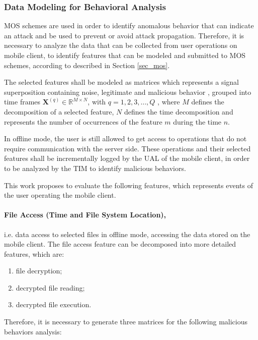 \documentclass[twocolumn]{svjour3}          	%
\begin{document}
\subsubsection{Data Modeling for Behavioral Analysis }
\label{sec_data}

MOS schemes are used in order to identify anomalous behavior that can indicate an attack and be used to prevent or avoid attack propagation. Therefore, it is necessary to analyze the data that can be collected from user operations on mobile client, to identify features that can be modeled and submitted to MOS schemes, according to described in Section \ref{sec_mos}.

The selected features shall be modeled as matrices which represents a signal superposition containing noise, legitimate and malicious behavior \cite{tenorio2013greatest}, grouped into time frames $\mathbf{X}^{(q)} \in \mathbb{R}^{M\times{N}}$, with $q = 1, 2, 3, \ldots, Q$ , where $M$ defines the decomposition of a selected feature, $N$ defines the time decomposition and represents the number of occurrences of the feature $m$ during the time $n$.

In offline mode, the user is still allowed to get access to operations that do not require communication with the server side. These operations and their selected features shall be incrementally logged by the UAL of the mobile client, in order to be analyzed by the TIM to identify malicious behaviors. 

This work proposes to evaluate the following features, which represents events of the user operating the mobile client.

\paragraph{\textbf{File Access (Time and File System Location)},}i.e. data access to selected files in offline mode, accessing the data stored on the mobile client. The file access feature can be decomposed into more detailed features, which are:

\begin{enumerate}
	\item file decryption; 
	\item decrypted file reading;
	\item decrypted file execution. 
\end{enumerate}

Therefore, it is necessary to generate three matrices for the following malicious behaviors analysis: 
\end{document}
